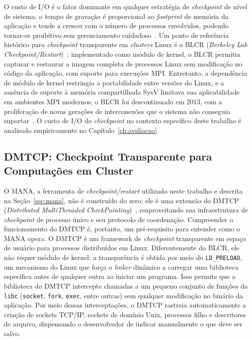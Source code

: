 O custo de I/O é o fator dominante em qualquer estratégia de \textit{checkpoint} de nível de
sistema: o tempo de gravação é proporcional ao \textit{footprint} de memória da
aplicação e tende a crescer com o número de processos envolvidos, podendo tornar-se
proibitivo sem gerenciamento cuidadoso~\cite{garg2019mana}. Um ponto de referência
histórico para \textit{checkpoint} transparente em \textit{clusters} Linux é o BLCR (\textit{Berkeley Lab
Checkpoint/Restart})~\cite{hargrove2006blcr}: implementado como módulo de kernel, o
BLCR permitia capturar e restaurar a imagem completa de processos Linux sem modificação
no código da aplicação, com suporte para execuções MPI. Entretanto, a dependência de
módulo de kernel restringia a portabilidade entre versões do Linux, e a ausência de
suporte à memória compartilhada SysV limitava sua aplicabilidade em ambientes MPI
modernos; o BLCR foi descontinuado em 2013, com a proliferação de novas gerações de
interconexões que o sistema não conseguia suportar~\cite{garg2019mana}. O custo de I/O
do \textit{checkpoint} no contexto específico deste trabalho é analisado empiricamente no
Capítulo~\ref{ch:avaliacao}.

\subsection[DMTCP: Checkpoint Transparente]{DMTCP: Checkpoint Transparente para Computações em Cluster}
\label{sec:dmtcp}

O MANA, a ferramenta de \textit{checkpoint/restart} utilizada neste trabalho e descrita na
Seção~\ref{sec:mana}, não é construído do zero: ele é uma extensão do
DMTCP (\textit{Distributed MultiThreaded CheckPointing})~\cite{ansel2009dmtcp},
reaproveitando sua infraestrutura de \textit{checkpoint} de processo único e seu protocolo de
coordenação. Compreender o funcionamento do DMTCP é, portanto, um pré-requisito para
entender como o MANA opera. O DMTCP é um framework de \textit{checkpoint} transparente em
espaço de usuário para processos distribuídos em Linux. Diferentemente do BLCR, ele não
requer módulo de kernel: a transparência é obtida por meio do \texttt{LD\_PRELOAD}, um
mecanismo do Linux que força o \textit{linker} dinâmico a carregar uma biblioteca
específica antes de qualquer outra ao iniciar um programa. Isso permite que a
biblioteca do DMTCP intercepte chamadas a um pequeno conjunto de funções da
\texttt{libc} (\texttt{socket}, \texttt{fork}, \texttt{exec}, entre outras) sem
qualquer modificação no binário da aplicação. Por meio dessas interceptações, o DMTCP
rastreia automaticamente a criação de sockets TCP/IP, sockets de domínio Unix,
processos filho e descritores de arquivo, dispensando o desenvolvedor de indicar
manualmente o que deve ser salvo.

